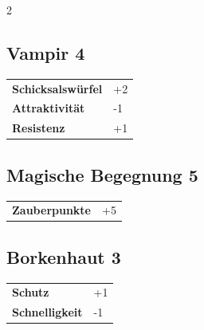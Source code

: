 \begin{multicols}{2}
\begin{tcolorbox}
    \subsection*{Vampir \hfill \small{4 }}
    \tcblower




\begin{tabular}{@{}ll@{}}
    \textbf{Schicksalswürfel} & +2\\
    \textbf{Attraktivität} & -1\\
    \textbf{Resistenz} & +1\\
\end{tabular}


\end{tcolorbox}

\begin{tcolorbox}
    \subsection*{Magische Begegnung \hfill \small{5 }}
    \tcblower




\begin{tabular}{@{}ll@{}}
    \textbf{Zauberpunkte} & +5\\
\end{tabular}


\end{tcolorbox}

\begin{tcolorbox}
    \subsection*{Borkenhaut \hfill \small{3 }}
    \tcblower




\begin{tabular}{@{}ll@{}}
    \textbf{Schutz} & +1\\
    \textbf{Schnelligkeit} & -1\\
\end{tabular}



\end{tcolorbox}
\end{multicols}
